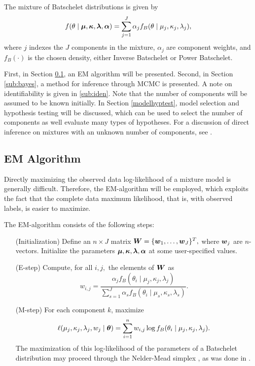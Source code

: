 The mixture of Batschelet distributions is given by
\begin{equation}
 f(\theta \mid \boldsymbol{\mu}, \boldsymbol{\kappa}, \boldsymbol{\lambda}, \boldsymbol{\alpha}) = \sum_{j = 1}^J\alpha_j f_B(\theta \mid \mu_j, \kappa_j, \lambda_j),
\end{equation}
where \(j\) indexes the \(J\) components in the mixture, $\alpha_j$ are component weights, and \(f_B(\cdot)\) is the chosen density, either Inverse Batschelet or Power Batschelet.


First, in Section \ref{sub:em}, an EM algorithm will be presented. Second, in Section \ref{sub:bayes}, a method for inference through MCMC is presented. A note on identifiability is given in \ref{sub:iden}. Note that the number of components will be assumed to be known initially. In Section \ref{modelhyptest}, model selection and hypothesis testing will be discussed, which can be used to select the number of components as well evaluate many types of hypotheses. For a discussion of direct inference on mixtures with an unknown number of components, see \citet{richardson1997bayesian}.

\subsection{EM Algorithm}
\label{sub:em}

Directly maximizing the observed data log-likelihood of a mixture model is generally difficult. Therefore, the EM-algorithm will be employed, which exploits the fact that the complete data maximum likelihood, that is, with observed labels, is easier to maximize.

The EM-algorithm consists of the following steps:

\begin{enumerate}
\item[(Initialization)] Define an \(n \times J\) matrix \(\boldsymbol{W} = \{\boldsymbol{w}_1, \dots, \boldsymbol{w}_J\}^T,\) where \(\boldsymbol{w}_j\) are \(n\)-vectors. Initialize the parameters \( \boldsymbol{\mu}, \boldsymbol{\kappa}, \boldsymbol{\lambda}, \boldsymbol{\alpha}\) at some user-specified values.
\item[(E-step)] Compute, for all \(i, j,\) the elements of \(\boldsymbol{W}\) as
\begin{equation}
w_{i, j} = \frac{\alpha_j f_B(\theta_i \mid \mu_j, \kappa_j, \lambda_j)}{\sum_{s = 1}^J \alpha_s f_B(\theta_i \mid \mu_s, \kappa_s, \lambda_s)}.
\end{equation}
\item[(M-step)] For each component \(k\), maximize
\begin{equation}
  \ell(\mu_j, \kappa_j, \lambda_j, w_j \mid \boldsymbol{\theta}) =\sum_{i=1}^n w_{i, j}  \log f_B(\theta_i \mid \mu_j, \kappa_j, \lambda_j).
\end{equation}
The maximization of this log-likelihood of the parameters of a Batschelet distribution may proceed through the Nelder-Mead simplex \citep{nelder1965simplex}, as was done in \citet{jones2012inverse}.
\end{enumerate}

